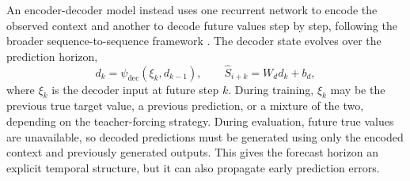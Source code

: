 An encoder-decoder model instead uses one recurrent network to encode the
observed context and another to decode future values step by step, following the
broader sequence-to-sequence framework \cite{sutskever2014sequence}. The decoder
state evolves over the prediction horizon,
\[
  d_k = \psi_{\mathrm{dec}}(\xi_k,d_{k-1}),
  \qquad
  \widehat{S}_{i+k}=W_d d_k+b_d ,
\]
where \(\xi_k\) is the decoder input at future step \(k\). During training,
\(\xi_k\) may be the previous true target value, a previous prediction, or a
mixture of the two, depending on the teacher-forcing strategy. During
evaluation, future true values are unavailable, so decoded predictions must be
generated using only the encoded context and previously generated outputs. This
gives the forecast horizon an explicit temporal structure, but it can also
propagate early prediction errors.

